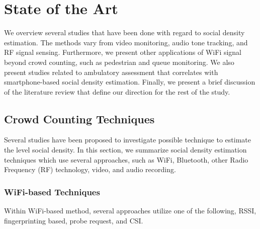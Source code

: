 \chapter{State of the Art}\label{ch:literature-review}

We overview several studies that have been done with regard to social density estimation. The methods vary from video monitoring, audio tone tracking, and \ac{RF} signal sensing. Furthermore, we present other applications of WiFi signal beyond crowd counting, such as pedestrian and queue monitoring. We also present studies related to ambulatory assessment that correlates with smartphone-based social density estimation. Finally, we present a brief discussion of the literature review that define our direction for the rest of the study.



\section{Crowd Counting Techniques} %
\label{sec:crowd_counting_techniques}
Several studies have been proposed to investigate possible technique to estimate the level social density. In this section, we summarize social density estimation techniques which use several approaches, such as WiFi, Bluetooth, other Radio Frequency (\ac{RF}) technology, video, and audio recording.

	\subsection{WiFi-based Techniques} %
	\label{sub:wifi-based-techniques}
	Within WiFi-based method, several approaches utilize one of the following, \ac{RSSI}, fingerprinting based, probe request, and \ac{CSI}.

